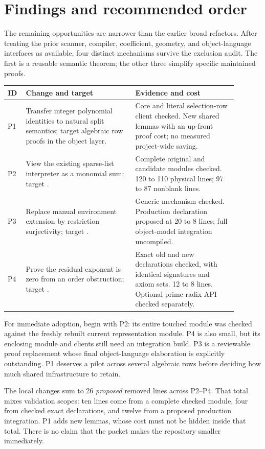 \section{Findings and recommended order}

The remaining opportunities are narrower than the earlier broad refactors.
After treating the prior scanner, compiler, coefficient, geometry, and
object-language interfaces as available, four distinct mechanisms survive
the exclusion audit. The first is a reusable semantic theorem; the other
three simplify specific maintained proofs.

\begin{longtable}{L{0.06\linewidth}L{0.43\linewidth}L{0.40\linewidth}}
\toprule ID & Change and target & Evidence and cost\\ \midrule
P1 & Transfer integer polynomial identities to natural split semantics;
target algebraic row proofs in the object layer. &
Core and literal selection-row client checked. New shared lemmas with an
up-front proof cost; no measured project-wide saving.\\
P2 & View the existing sparse-list interpreter as a monomial sum;
target . &
Complete original and candidate modules checked. 120 to 110 physical lines;
97 to 87 nonblank lines.\\
P3 & Replace manual environment extension by restriction surjectivity;
target . &
Generic mechanism checked. Production declaration proposed at 20 to 8 lines;
full object-model integration uncompiled.\\
P4 & Prove the residual exponent is zero from an order obstruction;
target . &
Exact old and new declarations checked, with identical signatures and axiom
sets. 12 to 8 lines. Optional prime-radix API checked separately.\\
\bottomrule
\end{longtable}

For immediate adoption, begin with P2: its entire touched module was checked
against the freshly rebuilt current representation module. P4 is also small,
but its enclosing module and clients still need an integration build.
P3 is a reviewable proof replacement whose final object-language elaboration
is explicitly outstanding. P1 deserves a pilot across several algebraic rows
before deciding how much shared infrastructure to retain.

The local changes sum to 26 \emph{proposed} removed lines across P2--P4.
That total mixes validation scopes: ten lines come from a complete checked
module, four from checked exact declarations, and twelve from a proposed
production integration. P1 adds new lemmas, whose cost must not be hidden
inside that total. There is no claim that the packet makes the repository
smaller immediately.

